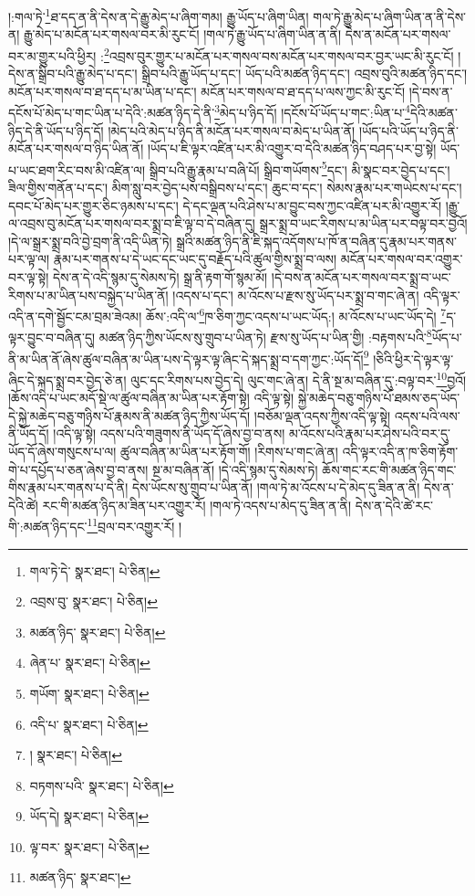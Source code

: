 །:གལ་ཏེ་\footnote{གལ་ཏེ་དེ་  སྣར་ཐང་།  པེ་ཅིན། }ཐ་དད་ན་ནི་དེས་ན་དེ་རྒྱུ་མེད་པ་ཞིག་གམ། རྒྱུ་ཡོད་པ་ཞིག་ཡིན། གལ་ཏེ་རྒྱུ་མེད་པ་ཞིག་ཡིན་ན་ནི་དེས་ན། རྒྱུ་མེད་པ་མངོན་པར་གསལ་བར་མི་རུང་ངོ། །གལ་ཏེ་རྒྱུ་ཡོད་པ་ཞིག་ཡིན་ན་ནི། དེས་ན་མངོན་པར་གསལ་བར་མ་གྱུར་པའི་ཕྱིར། :\footnote{འབྲས་བུ་  སྣར་ཐང་།  པེ་ཅིན། }འབྲས་བུར་གྱུར་པ་མངོན་པར་གསལ་བས་མངོན་པར་གསལ་བར་བྱར་ཡང་མི་རུང་ངོ། །དེས་ན་སྒྲིབ་པའི་རྒྱུ་མེད་པ་དང་། སྒྲིབ་པའི་རྒྱུ་ཡོད་པ་དང་། ཡོད་པའི་མཚན་ཉིད་དང་། འབྲས་བུའི་མཚན་ཉིད་དང་། མངོན་པར་གསལ་བ་ཐ་དད་པ་མ་ཡིན་པ་དང་། མངོན་པར་གསལ་བ་ཐ་དད་པ་ལས་ཀྱང་མི་རུང་ངོ། །དེ་བས་ན་དངོས་པོ་མེད་པ་གང་ཡིན་པ་དེའི་:མཚན་ཉིད་དེ་ནི་\footnote{མཚན་ཉིད་  སྣར་ཐང་།  པེ་ཅིན། }མེད་པ་ཉིད་དོ། །དངོས་པོ་ཡོད་པ་གང་:ཡིན་པ་\footnote{ཞེན་པ་  སྣར་ཐང་།  པེ་ཅིན། }དེའི་མཚན་ཉིད་དེ་ནི་ཡོད་པ་ཉིད་དོ། །མེད་པའི་མེད་པ་ཉིད་ནི་མངོན་པར་གསལ་བ་མེད་པ་ཡིན་ནོ། །ཡོད་པའི་ཡོད་པ་ཉིད་ནི་མངོན་པར་གསལ་བ་ཉིད་ཡིན་ནོ། །ཡོད་པ་ཇི་ལྟར་འཛིན་པར་མི་འགྱུར་བ་དེའི་མཚན་ཉིད་བཤད་པར་བྱ་སྟེ། ཡོད་པ་ཡང་ཐག་རིང་བས་མི་འཛིན་ལ། སྒྲིབ་པའི་རྒྱུ་རྣམ་པ་བཞི་པོ། སྒྲིབ་གཡོགས་\footnote{གཡོག་  སྣར་ཐང་།  པེ་ཅིན། }དང་། མི་སྣང་བར་བྱེད་པ་དང་། ཟིལ་གྱིས་གནོན་པ་དང་། མིག་སླུ་བར་བྱེད་པས་བསྒྲིབས་པ་དང་། ཆུང་བ་དང་། སེམས་རྣམ་པར་གཡེངས་པ་དང་། དབང་པོ་མེད་པར་གྱུར་ཅིང་ཉམས་པ་དང་། དེ་དང་ལྡན་པའི་ཤེས་པ་མ་བྱུང་བས་ཀྱང་འཛིན་པར་མི་འགྱུར་རོ། །རྒྱུ་ལ་འབྲས་བུ་མངོན་པར་གསལ་བར་སྨྲ་བ་ཇི་ལྟ་བ་དེ་བཞིན་དུ། སྒྲར་སྨྲ་བ་ཡང་རིགས་པ་མ་ཡིན་པར་བལྟ་བར་བྱའོ། །དེ་ལ་སྒྲར་སྨྲ་བའི་བྱེ་བྲག་ནི་འདི་ཡིན་ཏེ། སྒྲའི་མཚན་ཉིད་ནི་ཇི་སྐད་འདོགས་པ་ཁོ་ན་བཞིན་དུ་རྣམ་པར་གནས་པར་ལྟ་ལ། རྣམ་པར་གནས་པ་དེ་ཡང་དང་ཡང་དུ་བརྗོད་པའི་ཚུལ་གྱིས་སྨྲ་བ་ལས། མངོན་པར་གསལ་བར་འགྱུར་བར་ལྟ་སྟེ། དེས་ན་དེ་འདི་སྙམ་དུ་སེམས་ཏེ། སྒྲ་ནི་རྟག་གོ་སྙམ་མོ། །དེ་བས་ན་མངོན་པར་གསལ་བར་སྨྲ་བ་ཡང་རིགས་པ་མ་ཡིན་པས་བསྐྱེད་པ་ཡིན་ནོ། །འདས་པ་དང་། མ་འོངས་པ་རྫས་སུ་ཡོད་པར་སྨྲ་བ་གང་ཞེ་ན། འདི་ལྟར་འདི་ན་དགེ་སྦྱོང་ངམ་བྲམ་ཟེའམ། ཆོས་:འདི་ལ་\footnote{འདི་པ་  སྣར་ཐང་།  པེ་ཅིན། }ཁ་ཅིག་ཀྱང་འདས་པ་ཡང་ཡོད:། མ་འོངས་པ་ཡང་ཡོད་དེ། \footnote{།    སྣར་ཐང་།  པེ་ཅིན། }ད་ལྟར་བྱུང་བ་བཞིན་དུ། མཚན་ཉིད་ཀྱིས་ཡོངས་སུ་གྲུབ་པ་ཡིན་ཏེ། རྫས་སུ་ཡོད་པ་ཡིན་གྱི། :བརྟགས་པའི་\footnote{བཏགས་པའི་  སྣར་ཐང་།  པེ་ཅིན། }ཡོད་པ་ནི་མ་ཡིན་ནོ་ཞེས་ཚུལ་བཞིན་མ་ཡིན་པས་དེ་ལྟར་ལྟ་ཞིང་དེ་སྐད་སྨྲ་བ་དག་ཀྱང་:ཡོད་དོ།\footnote{ཡོད་དེ།  སྣར་ཐང་།  པེ་ཅིན། } །ཅིའི་ཕྱིར་དེ་ལྟར་ལྟ་ཞིང་དེ་སྐད་སྨྲ་བར་བྱེད་ཅེ་ན། ལུང་དང་རིགས་པས་བྱེད་དེ། ལུང་གང་ཞེ་ན། དེ་ནི་སྔ་མ་བཞིན་དུ་:བལྟ་བར་\footnote{ལྟ་བར་  སྣར་ཐང་།  པེ་ཅིན། }བྱའོ། །ཆོས་འདི་པ་ཡང་མདོ་སྡེ་ལ་ཚུལ་བཞིན་མ་ཡིན་པར་རྟོག་སྟེ། འདི་ལྟ་སྟེ། སྐྱེ་མཆེད་བཅུ་གཉིས་པོ་ཐམས་ཅད་ཡོད་དེ་སྐྱེ་མཆེད་བཅུ་གཉིས་པོ་རྣམས་ནི་མཚན་ཉིད་ཀྱིས་ཡོད་དོ། །བཅོམ་ལྡན་འདས་ཀྱིས་འདི་ལྟ་སྟེ། འདས་པའི་ལས་ནི་ཡོད་དོ། །འདི་ལྟ་སྟེ། འདས་པའི་གཟུགས་ནི་ཡོད་དོ་ཞེས་བྱ་བ་ནས། མ་འོངས་པའི་རྣམ་པར་ཤེས་པའི་བར་དུ་ཡོད་དོ་ཞེས་གསུངས་པ་ལ། ཚུལ་བཞིན་མ་ཡིན་པར་རྟོག་གོ། །རིགས་པ་གང་ཞེ་ན། འདི་ལྟར་འདི་ན་ཁ་ཅིག་རྟོག་གེ་པ་དཔྱོད་པ་ཅན་ཞེས་བྱ་བ་ནས། སྔ་མ་བཞིན་ནོ། །དེ་འདི་སྙམ་དུ་སེམས་ཏེ། ཆོས་གང་རང་གི་མཚན་ཉིད་གང་གིས་རྣམ་པར་གནས་པ་དེ་ནི། དེས་ཡོངས་སུ་གྲུབ་པ་ཡིན་ནོ། །གལ་ཏེ་མ་འོངས་པ་དེ་མེད་དུ་ཟིན་ན་ནི། དེས་ན་དེའི་ཚེ། རང་གི་མཚན་ཉིད་མ་ཟིན་པར་འགྱུར་རོ། །གལ་ཏེ་འདས་པ་མེད་དུ་ཟིན་ན་ནི། དེས་ན་དེའི་ཚེ་རང་གི་:མཚན་ཉིད་དང་\footnote{མཚན་ཉིད་  སྣར་ཐང་། }བྲལ་བར་འགྱུར་རོ། །
